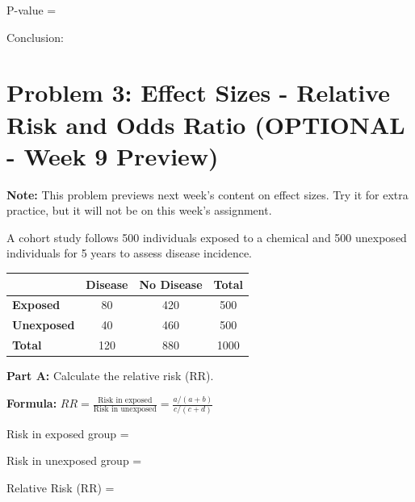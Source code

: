 \documentclass[11pt]{article}
\begin{document}
P-value =

\vspace{1cm}

Conclusion:

\vspace{2cm}

\newpage

\section{Problem 3: Effect Sizes - Relative Risk and Odds Ratio (OPTIONAL - Week 9 Preview)}

\textbf{Note:} This problem previews next week's content on effect sizes. Try it for extra practice, but it will not be on this week's assignment.

\vspace{0.3cm}

A cohort study follows 500 individuals exposed to a chemical and 500 unexposed individuals for 5 years to assess disease incidence.

\begin{center}
\begin{tabular}{l|cc|c}
& \textbf{Disease} & \textbf{No Disease} & \textbf{Total} \\
\hline
\textbf{Exposed} & 80 & 420 & 500 \\
\textbf{Unexposed} & 40 & 460 & 500 \\
\hline
\textbf{Total} & 120 & 880 & 1000 \\
\end{tabular}
\end{center}

\vspace{6pt}

\textbf{Part A:} Calculate the relative risk (RR).

\vspace{0.3cm}

\textbf{Formula:} $RR = \frac{\text{Risk in exposed}}{\text{Risk in unexposed}} = \frac{a/(a+b)}{c/(c+d)}$

\vspace{0.3cm}

Risk in exposed group =

\vspace{1.5cm}

Risk in unexposed group =

\vspace{1.5cm}

Relative Risk (RR) =
\end{document}
